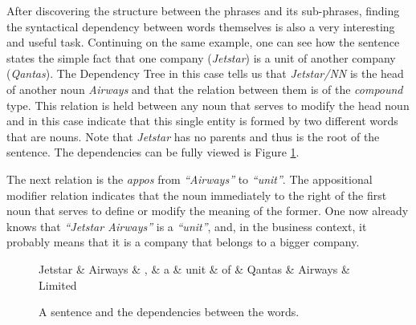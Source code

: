 \documentclass[11pt,a4paper,openright]{memoir}
\begin{document}
After discovering the structure between the phrases and its sub-phrases, finding the syntactical dependency between words themselves is also a very interesting and useful task. Continuing on the same example, one can see how the sentence states the simple fact that one company (\emph{Jetstar}) is a unit of another company (\emph{Qantas}). The Dependency Tree in this case tells us that \emph{Jetstar/NN} is the head of another noun \emph{Airways} and that the relation between them is of the \emph{compound} type. This relation is held between any noun that serves to modify the head noun and in this case indicate that this single entity is formed by two different words that are nouns. Note that \emph{Jetstar} has no parents and thus is the root of the sentence. The dependencies can be fully viewed is Figure \ref{fig:sub_sentences_dependency}.

The next relation is the \emph{appos} from \emph{\enquote{Airways}} to \emph{\enquote{unit}}. The appositional modifier relation indicates that the noun  immediately to the right of the first noun that serves to define or modify the meaning of the former. One now already knows that \emph{\enquote{Jetstar Airways}} is a \emph{\enquote{unit}}, and, in the business context, it probably means that it is a company that belongs to a bigger company.

\begin{figure}[!htbp]
  \centering
\begin{dependency}[theme = simple]
   \begin{deptext}[column sep=1em]
      Jetstar \& Airways \& , \& a \& unit \& of \& Qantas \& Airways \& Limited \\
   \end{deptext}
\end{dependency}
  \caption[A sentence and the dependencies between the words.]{A sentence and the dependencies between the words.}
  \label{fig:sub_sentences_dependency}
\end{figure}
\end{document}
